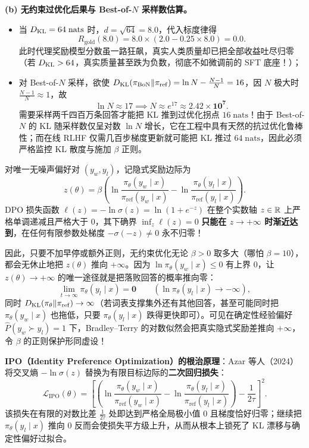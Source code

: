 \textbf{(b) 无约束过优化后果与 Best-of-$N$ 采样数估算。}
\begin{itemize}
  \item 当 $D_{\mathrm{KL}} = 64\;\text{nats}$ 时，$d = \sqrt{64} = 8.0$，代入标度律得
  \[
    R_{\mathrm{gold}}(8.0) = 8.0 \times (2.0 - 0.25 \times 8.0) = \mathbf{0.0}.
  \]
  此时代理奖励模型分数虽一路狂飙，真实人类质量却已把全部收益吐尽归零（若 $D_{\mathrm{KL}} > 64$，真实质量甚至跌为负数，彻底不如微调前的 SFT 底座！）；
  \item 对 Best-of-$N$ 采样，欲使 $D_{\mathrm{KL}}(\pi_{\mathrm{BoN}} \| \pi_{\mathrm{ref}}) = \ln N - \frac{N-1}{N} = 16$，因 $N$ 极大时 $\frac{N-1}{N} \approx 1$，故
  \[
    \ln N \approx 17 \implies N \approx e^{17} \approx \mathbf{2.42 \times 10^7}.
  \]
  需要采样两千四百万条回答才能把 KL 推到过优化拐点 $16\;\text{nats}$！由于 Best-of-$N$ 的 KL 随采样数仅呈对数 $\ln N$ 增长，它在工程中具有天然的抗过优化鲁棒性；而在线 RLHF 仅需几百步梯度更新就可能把 KL 推过 $64\;\text{nats}$，因此必须严格监控 KL 散度与施加 $\beta$ 正则。
\end{itemize}


对唯一无噪声偏好对 $(y_w, y_l)$，记隐式奖励边际为
\[
  z(\theta) = \beta\!\left(\ln\frac{\pi_\theta(y_w \mid x)}{\pi_{\mathrm{ref}}(y_w \mid x)} - \ln\frac{\pi_\theta(y_l \mid x)}{\pi_{\mathrm{ref}}(y_l \mid x)}\right).
\]
DPO 损失函数 $\ell(z) = -\ln \sigma(z) = \ln(1 + e^{-z})$ 在整个实数轴 $z \in \mathbb{R}$ 上严格单调递减且严格大于 $0$，其下确界 $\inf_z \ell(z) = 0$ \textbf{只能在 $z \to +\infty$ 时渐近达到}，在任何有限参数处梯度 $-\sigma(-z) \neq 0$ 永不归零！

因此，只要不加早停或额外正则，无约束优化无论 $\beta > 0$ 取多大（哪怕 $\beta = 10$），都会无休止地把 $z(\theta)$ 推向 $+\infty$。因为 $\ln \pi_\theta(y_w \mid x) \le 0$ 有上界 $0$，让 $z(\theta) \to +\infty$ 的唯一途径就是把落败回答的概率推向零：
\[
  \lim_{t \to \infty} \pi_\theta(y_l \mid x) = \mathbf{0} \qquad (\ln \pi_\theta(y_l \mid x) \to -\infty),
\]
同时 $D_{\mathrm{KL}}(\pi_\theta \| \pi_{\mathrm{ref}}) \to \infty$（若词表支撑集外还有其他回答，甚至可能同时把 $\pi_\theta(y_w \mid x)$ 也拖低，只要 $\pi_\theta(y_l \mid x)$ 跌得更快即可）。可见在确定性经验偏好 $\hat{P}(y_w \succ y_l) = 1$ 下，Bradley--Terry 的对数似然会把真实隐式奖励差推向 $+\infty$，令 $\beta$ 的正则保护形同虚设！

\textbf{IPO（Identity Preference Optimization）的根治原理}：Azar 等人（2024）将交叉熵 $-\ln \sigma(z)$ 替换为有限目标边际的\textbf{二次回归损失}：
\[
  \mathcal{L}_{\mathrm{IPO}}(\theta) = \left[\left(\ln\frac{\pi_\theta(y_w \mid x)}{\pi_{\mathrm{ref}}(y_w \mid x)} - \ln\frac{\pi_\theta(y_l \mid x)}{\pi_{\mathrm{ref}}(y_l \mid x)}\right) - \frac{1}{2\tau}\right]^2.
\]
该损失在有限的对数比差 $\frac{1}{2\tau}$ 处即达到严格全局极小值 $0$ 且梯度恰好归零；继续把 $\pi_\theta(y_l \mid x)$ 推向 $0$ 反而会使损失平方级上升，从而从根本上锁死了 KL 漂移与确定性偏好过拟合。

